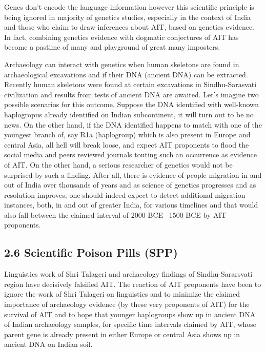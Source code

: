 \newpage

Genes don’t encode the language information however this scientific principle is being ignored in majority of genetics studies, especially in the context of India and those who claim to draw inferences about AIT, based on genetics evidence. In fact, combining genetics evidence with dogmatic conjectures of AIT has become a pastime of many and playground of great many imposters.

Archaeology can interact with genetics when human skeletons are found in archaeological excavations and if their DNA (ancient DNA) can be extracted. Recently human skeletons were found at certain excavations in Sindhu-Sarasvati civilization and results from tests of ancient DNA are awaited. Let’s imagine two possible scenarios for this outcome. Suppose the DNA identified with well-known haplogropus already identified on Indian subcontinent, it will turn out to be no news. On the other hand, if the DNA identified happens to match with one of the youngest branch of, say R1a (haplogroup) which is also present in Europe and central Asia, all hell will break loose, and expect AIT proponents to flood the social media and peers reviewed journals touting such an occurrence as evidence of AIT. On the other hand, a serious researcher of genetics would not be surprised by such a finding. After all, there is evidence of people migration in and out of India over thousands of years and as science of genetics progresses and as resolution improves, one should indeed expect to detect additional migration instances, both, in and out of greater India, for various timelines and that would also fall between the claimed interval of 2000 BCE –1500 BCE by AIT proponents.


\subsection*{2.6 Scientific Poison Pills (SPP)}

Linguistics work of Shri Talageri and archaeology findings of Sindhu-Sararsvati region have decisively falsified AIT. The reaction of AIT proponents have been to ignore the work of Shri Talageri on linguistics and to minimize the claimed importance of archaeology evidence (by these very proponents of AIT) for the survival of AIT and to hope that younger haplogroups show up in ancient DNA of Indian archaeology samples, for specific time intervals claimed by AIT, whose parent gene is already present in either Europe or central Asia shows up in ancient DNA on Indian soil.

